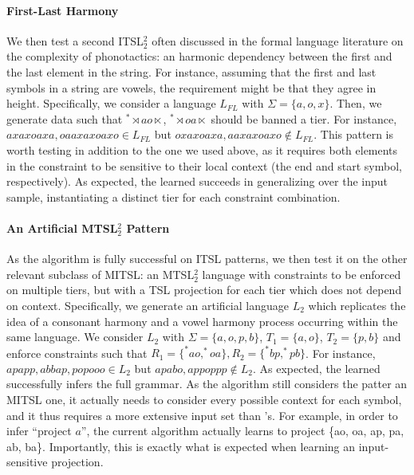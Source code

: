 \documentclass[11pt,a4paper]{article}
\begin{document}
\paragraph{First-Last Harmony}
We then test a second ITSL$^2_2$ often discussed in the formal language literature on the complexity of phonotactics: an harmonic dependency between the first and the last element in the string.
For instance, assuming that the first and last symbols in a string are vowels, the requirement might be that they agree in height.
Specifically, we consider a language $L_{FL}$ with $\Sigma =\{ a, o, x\}$.
Then, we generate data such that $^*\rtimes ao\ltimes$, $^*\rtimes oa\ltimes$ should be banned a tier.
For instance, $axaxoaxa, oaaxaxoaxo \in L_{FL}$ but  $oxaxoaxa, aaxaxoaxo \notin L_{FL}$.
This pattern is worth testing in addition to the one we used above, as it requires both elements in the constraint to be sensitive to their local context (the end and start symbol, respectively).
As expected, the learned succeeds in generalizing over the input sample, instantiating a distinct tier for each constraint combination.


\paragraph{An Artificial MTSL$^2_2$ Pattern} As the algorithm is fully successful on ITSL patterns, we then test it on the other relevant subclass of MITSL: an MTSL$^2_2$ language with constraints to be enforced on multiple tiers, but with a TSL projection for each tier which does not depend on context.
Specifically, we generate an artificial language $L_2$ which replicates the idea of a consonant harmony and a vowel harmony process occurring within the same language.
We consider  $L_2$ with $\Sigma = \{a, o, p, b\}$, $T_1=\{a,o\}$, $T_2=\{p,b\}$ and enforce constraints such that $R_1 = \{^*ao, ^*oa\}, R_2= \{^*bp, ^*pb\}$.
For instance, $apapp, abbap, popooo \in L_2$ but  $apabo, appoppp \notin L_2$.
As expected, the learned successfully infers the full grammar.
As the algorithm still considers the patter an MITSL one, it actually needs to consider every possible context for each symbol, and it thus requires a more extensive input set than \citet{McMullinSCIL2019}'s.
For example, in order to infer ``project $a$'', the current algorithm actually learns to project \{ao, oa, ap, pa, ab, ba\}.
Importantly, this is exactly what is expected when learning an input-sensitive projection.
\end{document}

